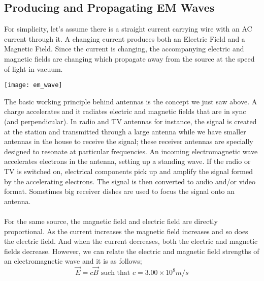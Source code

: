 \documentclass[11pt]{article}
\begin{document}
	\subsection*{Producing and Propagating EM Waves}
	For simplicity, let's assume there is a straight current carrying wire with an AC current through it. A changing current produces both an Electric Field and a Magnetic Field. Since the current is changing, the accompanying electric and magnetic fields are changing which propagate away from the source at the speed of light in vacuum.
	\begin{center}
		\texttt{[image: em\_wave]}
	\end{center}
	The basic working principle behind antennas is the concept we just saw above. A charge accelerates and it radiates electric and magnetic fields that are in sync (and perpendicular). In radio and TV antennas for instance, the signal is created at the station and transmitted through a large antenna while we have smaller antennas in the house to receive the signal; these receiver antennas are specially designed to resonate at particular frequencies. An incoming electromagnetic wave accelerates electrons in the antenna, setting up a standing wave. If the radio or TV is switched on, electrical components pick up and amplify the signal formed by the accelerating electrons. The signal is then converted to audio and/or video format. Sometimes big receiver dishes are used to focus the signal onto an antenna. \\ \\
	For the same source, the magnetic field and electric field are directly proportional. As the current increases the magnetic field increases and so does the electric field. And when the current decreases, both the electric and magnetic fields decrease. However, we can relate the electric and magnetic field strengths of an electromagnetic wave and it is as follows;
	$$\vec{E}=c\vec{B}\text{ such that }c=3.00\times10^8m/s$$  
\end{document}
